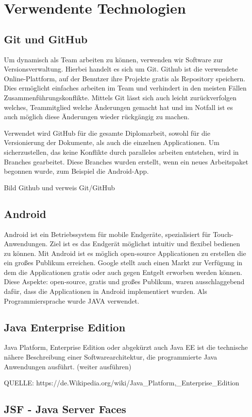 \chapter{Verwendente Technologien}
\section{Git und GitHub}
Um dynamisch als Team arbeiten zu können, verwenden wir Software zur Versionsverwaltung. Hierbei handelt es sich um Git. 
Github ist die verwendete Online-Plattform, auf der Benutzer ihre Projekte gratis als Repository speichern. Dies ermöglicht einfaches arbeiten im Team und verhindert in den meisten Fällen Zusammenführungskonflikte. Mittels Git lässt sich auch leicht zurückverfolgen welches, Teammitglied welche Änderungen gemacht hat und im Notfall ist es auch möglich diese Änderungen wieder rückgängig zu machen.

Verwendet wird GitHub für die gesamte Diplomarbeit, sowohl für die Versionierung der Dokumente, als auch  die einzelnen Applicationen. Um sicherzustellen, das keine Konflikte durch paralleles arbeiten entstehen, wird in Branches gearbeitet. Diese Branches wurden erstellt, wenn ein neues Arbeitspaket begonnen wurde, zum Beispiel die Android-App.

Bild Github und verweis Git/GitHub

\section{Android}

Android ist ein Betriebssystem für mobile Endgeräte, spezialisiert für Touch-Anwendungen. Ziel ist es das Endgerät möglichst intuitiv und flexibel bedienen zu können. Mit Android ist es möglich open-source Applicationen zu erstellen die ein großes Publikum erreichen. Google stellt auch einen Markt zur Verfügung in dem die Applicationen gratis oder auch gegen Entgelt erworben werden können.
Diese Aspekte: open-source, gratis und großes Publikum, waren ausschlaggebend dafür, dass die Applicationen in Android implementiert wurden. Als Programmiersprache wurde JAVA verwendet.




\section{Java Enterprise Edition}\label{sec:javaee}
Java Platform, Enterprise Edition oder abgekürzt auch Java EE ist die technische nähere Beschreibung einer Softwarearchitektur, die programmierte Java Anwendungen ausführt.
(weiter ausführen)

QUELLE: https://de.Wikipedia.org/wiki/Java_Platform,_Enterprise_Edition

\section{JSF - Java Server Faces}\label{sec:javaee}
